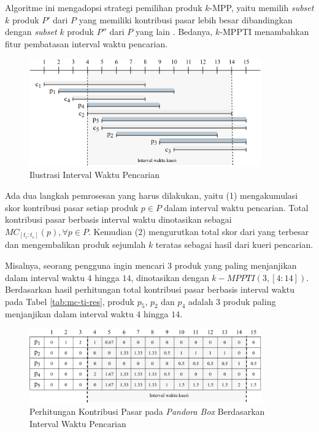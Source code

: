 Algoritme ini mengadopsi strategi pemilihan produk $k$-MPP, yaitu memilih \textit{subset} $k$ produk $P'$ dari $P$ yang memiliki kontribusi pasar lebih besar dibandingkan dengan \textit{subset} $k$ produk $P''$ dari $P$ yang lain \cite{kmpp}. Bedanya, $k$-MPPTI menambahkan fitur pembatasan interval waktu pencarian.

\begin{figure}[h]
	\centering
	\includegraphics[width=10cm]{assets/img/bab3/timeline-interval.png}
	\caption{Ilustrasi Interval Waktu Pencarian}
	\label{fig:timeline-kueri}
\end{figure}

Ada dua langkah pemrosesan yang harus dilakukan, yaitu (1) mengakumulasi skor kontribusi pasar setiap produk $p \in P$ dalam interval waktu pencarian. Total kontribusi pasar berbasis interval waktu dinotasikan sebagai $MC_{[t_i:t_e]}(p), \forall p \in P$. Kemudian (2) mengurutkan total skor dari yang terbesar dan mengembalikan produk sejumlah $k$ teratas sebagai hasil dari kueri pencarian. 

Misalnya, seorang pengguna ingin mencari $3$ produk yang paling menjanjikan dalam interval waktu $4$ hingga $14$, dinotasikan dengan $k-MPPTI(3, [4:14])$. Berdasarkan hasil perhitungan total kontribusi pasar berbasis interval waktu pada Tabel \ref{tab:mc-ti-res}, produk $p_5$, $p_2$ dan $p_4$ adalah $3$ produk paling menjanjikan dalam interval waktu $4$ hingga $14$.

\begin{figure}[h]
	\centering
	\includegraphics[width=10cm]{assets/img/bab3/pbox-kueri.png}
	\caption{Perhitungan Kontribusi Pasar pada \textit{Pandora Box} Berdasarkan Interval Waktu Pencarian}
	\label{fig:pbox-kueri}
\end{figure}

